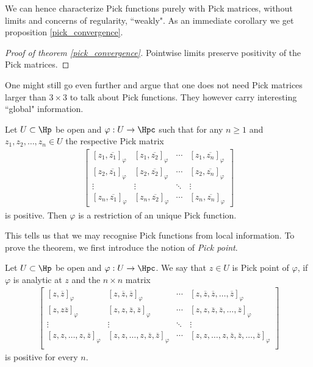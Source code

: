 We can hence characterize Pick functions purely with Pick matrices, without limits and concerns of regularity, ``weakly". As an immediate corollary we get proposition \ref{pick_convergence}.

\begin{proof}[Proof of theorem \ref{pick_convergence}]
Pointwise limits preserve positivity of the Pick matrices.
\end{proof}

One might still go even further and argue that one does not need Pick matrices larger than $3 \times 3$ to talk about Pick functions. They however carry interesting ``global" information.

\begin{lause}\label{open_pick_nevanlinna}
	Let $U \subset \Hp$ be open and $\varphi : U \to \Hpc$ such that for any $n \geq 1$ and $z_{1}, z_{2}, \ldots, z_{n} \in U$ the respective Pick matrix
	\begin{align*}
	\begin{bmatrix}
		[z_{1}, \overline{z_{1}}]_{\varphi} & [z_{1}, \overline{z_{2}}]_{\varphi} & \cdots & [z_{1}, \overline{z_{n}}]_{\varphi} \\
		[z_{2}, \overline{z_{1}}]_{\varphi} & [z_{2}, \overline{z_{2}}]_{\varphi} & \cdots & [z_{2}, \overline{z_{n}}]_{\varphi} \\
		\vdots & \vdots & \ddots & \vdots \\
		[z_{n}, \overline{z_{1}}]_{\varphi} & [z_{n}, \overline{z_{2}}]_{\varphi} & \cdots &  [z_{n}, \overline{z_{n}}]_{\varphi}
	\end{bmatrix}
	\end{align*}
	is positive. Then $\varphi$ is a restriction of an unique Pick function.
\end{lause}

This tells us that we may recognise Pick functions from local information. To prove the theorem, we first introduce the notion of \textit{Pick point}.

\begin{maar}
	Let $U \subset \Hp$ be open and $\varphi : U \to \Hpc$. We say that $z \in U$ is Pick point of $\varphi$, if $\varphi$ is analytic at $z$ and the $n \times n$ matrix
	\begin{align*}
	\begin{bmatrix}
		[z, \overline{z}]_{\varphi} & [z, \overline{z}, \overline{z} ]_{\varphi} & \cdots & [z, \overline{z}, \overline{z}, \ldots, \overline{z}]_{\varphi} \\
		[z, z \overline{z}]_{\varphi} & [z, z, \overline{z}, \overline{z} ]_{\varphi} & \cdots & [z, z, \overline{z}, \overline{z}, \ldots, \overline{z}]_{\varphi} \\
		\vdots & \vdots & \ddots & \vdots \\
		[z, z, \ldots, z, \overline{z}]_{\varphi} & [z, z, \ldots, z, \overline{z}, \overline{z} ]_{\varphi} & \cdots & [z, z, \ldots, z, \overline{z}, \overline{z}, \ldots, \overline{z}]_{\varphi} \\
	\end{bmatrix}
	\end{align*}
	is positive for every $n$.
\end{maar}

